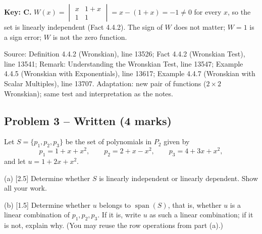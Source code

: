 \documentclass[11pt,a4paper]{article}
\newcommand{\Src}[1]{{\footnotesize\color{black!65}Source: #1}}
\begin{document}
\textbf{Key: C.} $W(x)=\begin{vmatrix}x&1+x\\1&1\end{vmatrix}=x-(1+x)=-1\neq0$ for every $x$, so the set is linearly independent (Fact 4.4.2). The sign of $W$ does not matter; $W=1$ is a sign error; $W$ is not the zero function.\par
\Src{Definition 4.4.2 (Wronskian), line 13526; Fact 4.4.2 (Wronskian Test), line 13541; Remark: Understanding the Wronskian Test, line 13547; Example 4.4.5 (Wronskian with Exponentials), line 13617; Example 4.4.7 (Wronskian with Scalar Multiples), line 13707. Adaptation: new pair of functions ($2\times2$ Wronskian); same test and interpretation as the notes.}\par
\subsection*{Problem 3 -- Written (4 marks)}
Let $S=\{p_1,p_2,p_3\}$ be the set of polynomials in $P_2$ given by\[p_1=1+x+x^{2},\qquad p_2=2+x-x^{2},\qquad p_3=4+3x+x^{2},\]and let $u=1+2x+x^{2}$.\par (a) [2.5] Determine whether $S$ is linearly independent or linearly dependent. Show all your work.\par (b) [1.5] Determine whether $u$ belongs to $\operatorname{span}(S)$, that is, whether $u$ is a linear combination of $p_1,p_2,p_3$. If it is, write $u$ as such a linear combination; if it is not, explain why. (You may reuse the row operations from part (a).)\par
\end{document}
